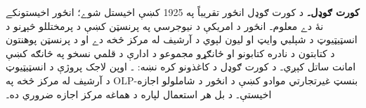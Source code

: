 \textbf{کورت ګوډل۔} د کورت ګوډل انځور تقريباً په 1925 کښې اخيستل شوے؛ انځور اخيستونکے نۀ دے معلوم۔ انځور د امريکې د نيوجرسي په پرنسټن کښې د پرمختللو څېړنو د انسټيټيوټ د شېلبي وايټ او ليون لېوي د آرشيف له مرکز څخه دے او د پرنسټن پوهنتون د کتابتون د نادره کتابونو او ځانګړو مجموعو د ادارې د قلمي نسخو په څانګه کښې امانت ساتل کېږي۔ د کورت ګوډل د کاغذونو کره نښه: ۔ اوپن لاجک پروژې د انسټيټيوټ د آرشيف له مرکز څخه په OLP-بنسټ غيرتجارتي موادو کښې د انځور د شاملولو اجازه اخيستې۔ د بل هر استعمال لپاره د هماغه مرکز اجازه ضروري ده۔
